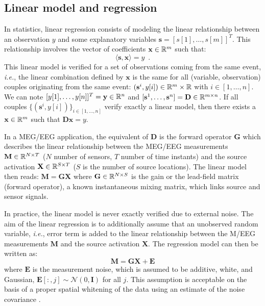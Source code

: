 \subsection{Linear model and regression}
In statistics, linear regression consists of modeling the linear relationship between an observation $y$ and some explanatory variables $\mathbf{s}=[s[1],\dots ,s[m]]^T$. This relationship involves the vector of coefficients $\mathbf{x}\in\mathbb{R}^m$ such that:
\begin{equation} \label{eq_linreg}
	\langle\mathbf{s}, \mathbf{x}\rangle = y \enspace .
\end{equation}
This linear model is verified for a set of observations coming from the same event, \textit{i.e.}, the linear combination defined by $\mathbf{x}$ is the same for all (variable, observation) couples originating from the same event: $(\mathbf{s}^i, y[i])\in\mathbb{R}^m\times\mathbb{R}$ with $i\in [1,\dots ,n]$. We can note $[y[1], \dots ,y[n]]^T=\mathbf{y}\in\mathbb{R}^n$ and $[\mathbf{s}^1,\dots ,\mathbf{s}^n]=\mathbf{D}\in\mathbb{R}^{m\times n}$. If all couples $\{(\mathbf{s}^i,y[i])\}_{i\in [1,\dots ,n]}$ verify exactly a linear model, then there exists a $\mathbf{x}\in\mathbb{R}^m$ such that $\mathbf{Dx}=y$.

In a MEG/EEG application, the equivalent of $\mathbf{D}$ is the forward operator $\mathbf{G}$ which describes the linear relationship between the MEG/EEG measurements $\mathbf{M}\in\mathbb{R}^{N\times T}$ ($N$ number of sensors, $T$ number of time instants) and the source activation $\mathbf{X}\in\mathbb{R}^{S\times T}$ ($S$ is the number of source locations). The linear model then reads: $\mathbf{M} = \mathbf{GX}$ where $\mathbf{G}\in\mathbb{R}^{N\times S}$ is the gain or the lead-field matrix (forward operator), a known instantaneous mixing matrix, which links source and sensor signals. 

In practice, the linear model is never exactly verified due to external noise. The aim of the linear regression is to additionally assume that an unobserved random variable, \textit{i.e.}, error term is added to the linear relationship between the M/EEG measurements $\mathbf{M}$ and the source activation $\mathbf{X}$. The regression model can then be written as:
\begin{equation} \label{eq_linmeeg}
	\mathbf{M} = \mathbf{GX} + \mathbf{E}
\end{equation}
where $\mathbf{E}$ is the measurement noise, which is assumed to be additive, white, and Gaussian, \mbox{$\mathbf{E}[:,j]\sim\mathcal{N}(0,\mathbf{I})$} for all $j$. This assumption is acceptable on the basis of a proper spatial whitening of the data using an estimate of the noise covariance \cite{engemann2015automated}.

